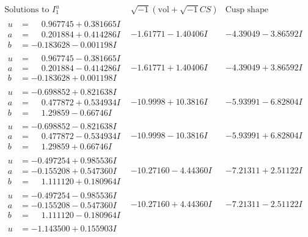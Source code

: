 \documentclass[1p]{elsarticle_modified}
\theoremstyle{definition}
\newcommand{\I}{\sqrt{-1}}
\begin{document}
$$\begin{array}{c|c|c}  
\text{Solutions to }I^u_{1}& \I (\text{vol} + \sqrt{-1}CS) & \text{Cusp shape}\\
 \hline 
\begin{aligned}
u &= \phantom{-}0.967745 + 0.381665 I \\
a &= \phantom{-}0.201884 + 0.414286 I \\
b &= -0.183628 - 0.001198 I\end{aligned}
 & -1.61771 - 1.40406 I & -4.39049 - 3.86592 I \\ \hline\begin{aligned}
u &= \phantom{-}0.967745 - 0.381665 I \\
a &= \phantom{-}0.201884 - 0.414286 I \\
b &= -0.183628 + 0.001198 I\end{aligned}
 & -1.61771 + 1.40406 I & -4.39049 + 3.86592 I \\ \hline\begin{aligned}
u &= -0.698852 + 0.821638 I \\
a &= \phantom{-}0.477872 + 0.534934 I \\
b &= \phantom{-}1.29859 - 0.66746 I\end{aligned}
 & -10.9998 + 10.3816 I & -5.93991 - 6.82804 I \\ \hline\begin{aligned}
u &= -0.698852 - 0.821638 I \\
a &= \phantom{-}0.477872 - 0.534934 I \\
b &= \phantom{-}1.29859 + 0.66746 I\end{aligned}
 & -10.9998 - 10.3816 I & -5.93991 + 6.82804 I \\ \hline\begin{aligned}
u &= -0.497254 + 0.985536 I \\
a &= -0.155208 + 0.547360 I \\
b &= \phantom{-}1.111120 + 0.180964 I\end{aligned}
 & -10.27160 - 4.44360 I & -7.21311 + 2.51122 I \\ \hline\begin{aligned}
u &= -0.497254 - 0.985536 I \\
a &= -0.155208 - 0.547360 I \\
b &= \phantom{-}1.111120 - 0.180964 I\end{aligned}
 & -10.27160 + 4.44360 I & -7.21311 - 2.51122 I \\ \hline\begin{aligned}
u &= -1.143500 + 0.155903 I \\

\end{aligned}
\end{array}$$
\end{document}
